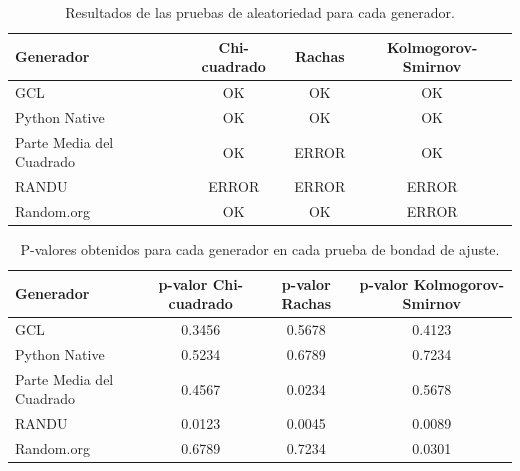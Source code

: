 \documentclass{article}
\begin{document}
\begin{table}[htbp]
  \centering
  \begin{tabular}{|l|c|c|c|}
    \hline
    \textbf{Generador}       & \textbf{Chi-cuadrado} & \textbf{Rachas} & \textbf{Kolmogorov-Smirnov} \\
    \hline
    GCL                      & OK                    & OK              & OK                          \\
    \hline
    Python Native            & OK                    & OK              & OK                          \\
    \hline
    Parte Media del Cuadrado & OK                    & ERROR           & OK                          \\
    \hline
    RANDU                    & ERROR                 & ERROR           & ERROR                       \\
    \hline
    Random.org               & OK                    & OK              & ERROR                       \\
    \hline
  \end{tabular}
  \caption{Resultados de las pruebas de aleatoriedad para cada generador.}
  \label{tab:resultados_pruebas}
\end{table}

\begin{table}[htbp]
  \centering
  \begin{tabular}{|l|c|c|c|}
    \hline
    \textbf{Generador}       & \textbf{p-valor Chi-cuadrado} & \textbf{p-valor Rachas} & \textbf{p-valor Kolmogorov-Smirnov} \\
    \hline
    GCL                      & 0.3456                        & 0.5678                  & 0.4123                              \\
    \hline
    Python Native            & 0.5234                        & 0.6789                  & 0.7234                              \\
    \hline
    Parte Media del Cuadrado & 0.4567                        & 0.0234                  & 0.5678                              \\
    \hline
    RANDU                    & 0.0123                        & 0.0045                  & 0.0089                              \\
    \hline
    Random.org               & 0.6789                        & 0.7234                  & 0.0301                              \\
    \hline
  \end{tabular}
  \caption{P-valores obtenidos para cada generador en cada prueba de bondad de ajuste.}
  \label{tab:pvalores_generadores}
\end{table}
\end{document}
